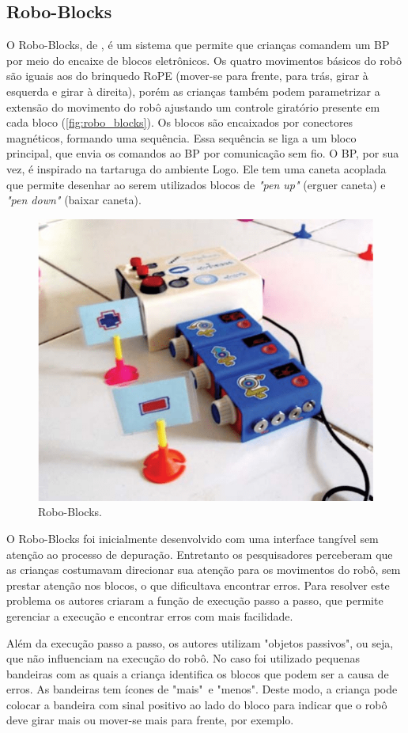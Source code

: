 \subsection{Robo-Blocks}
O Robo-Blocks, de , é um sistema que permite que crianças comandem um BP por meio do encaixe de blocos eletrônicos. Os quatro movimentos básicos do robô são iguais aos do brinquedo RoPE (mover-se para frente, para trás, girar à esquerda e girar à direita), porém as crianças também podem parametrizar a extensão do movimento do robô ajustando um controle giratório presente em cada bloco (\autoref{fig:robo_blocks}). Os blocos são encaixados por conectores magnéticos, formando uma sequência. Essa sequência se liga a um bloco principal, que envia os comandos ao BP por comunicação sem fio. O BP, por sua vez, é inspirado na tartaruga do ambiente Logo. Ele tem uma caneta acoplada que permite desenhar ao serem utilizados blocos de \textit{"pen up"} (erguer caneta) e \textit{"pen down"} (baixar caneta).

\begin{figure}[!h]
    \centering
    \includegraphics[width=.7\linewidth,fbox]{figs/robo_blocks.png}
    \caption{Robo-Blocks.}
    \label{fig:robo_blocks}
\end{figure}
O Robo-Blocks foi inicialmente desenvolvido com uma interface tangível sem atenção ao processo de depuração. Entretanto os pesquisadores perceberam que as crianças costumavam direcionar sua atenção para os movimentos do robô, sem prestar atenção nos blocos, o que dificultava encontrar erros. Para resolver este problema os autores criaram a função de execução passo a passo, que permite gerenciar a execução e encontrar erros com mais facilidade.

Além da execução passo a passo, os autores utilizam "objetos passivos", ou seja, que não influenciam na execução do robô. No caso foi utilizado pequenas bandeiras com as quais a criança identifica os blocos que podem ser a causa de erros. As bandeiras tem ícones de "mais"\ e "menos". Deste modo, a criança pode colocar a bandeira com sinal positivo ao lado do bloco para indicar que o robô deve girar mais ou mover-se mais para frente, por exemplo. 


